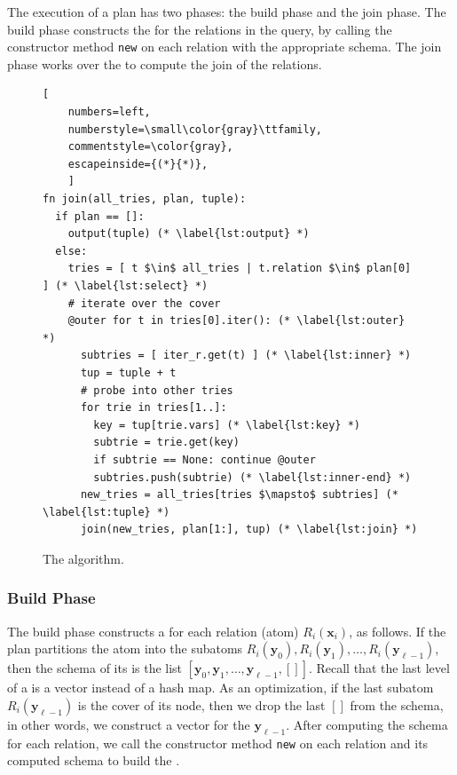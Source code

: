 
The execution of a \FJ plan has two phases: the build phase and the
join phase.  The build phase constructs the \GHTs for the relations in
the query, by calling the constructor method \lstinline|new| on each
relation with the appropriate schema.  The join phase works over the
\GHTs to compute the join of the relations.


\begin{figure}
  \begin{lstlisting}[
    numbers=left,
    numberstyle=\small\color{gray}\ttfamily,
    commentstyle=\color{gray},
    escapeinside={(*}{*)},
    ]
fn join(all_tries, plan, tuple):
  if plan == []:
    output(tuple) (* \label{lst:output} *)
  else:
    tries = [ t $\in$ all_tries | t.relation $\in$ plan[0] ] (* \label{lst:select} *)
    # iterate over the cover
    @outer for t in tries[0].iter(): (* \label{lst:outer} *)
      subtries = [ iter_r.get(t) ] (* \label{lst:inner} *)
      tup = tuple + t
      # probe into other tries
      for trie in tries[1..]:     
        key = tup[trie.vars] (* \label{lst:key} *)
        subtrie = trie.get(key)
        if subtrie == None: continue @outer
        subtries.push(subtrie) (* \label{lst:inner-end} *)
      new_tries = all_tries[tries $\mapsto$ subtries] (* \label{lst:tuple} *)
      join(new_tries, plan[1:], tup) (* \label{lst:join} *)
\end{lstlisting}
  \caption{The \FJ algorithm.}
  \label{fig:fj-algo}
\end{figure}

\subsubsection*{Build Phase}
The build phase constructs a \GHT for each relation (atom)
$R_i(\bm x_i)$, as follows.  If the plan partitions the atom into the
subatoms $R_i(\bm y_0), R_i(\bm y_1), \ldots, R_i(\bm y_{\ell-1})$,
then the schema of its \GHT is the list
$[\bm y_0, \bm y_1, \ldots, \bm y_{\ell-1}, []]$.  Recall that the
last level of a \GHT is a vector instead of a hash map. As an
optimization, if the last subatom $R_i(\bm y_{\ell-1})$ is the cover
of its node, then we drop the last $[]$ from the schema, in other
words, we construct a vector for the $\bm y_{\ell-1}$.  After
computing the schema for each relation, we call the constructor method
\lstinline|new| on each relation and its computed schema to build the
\GHTs.

